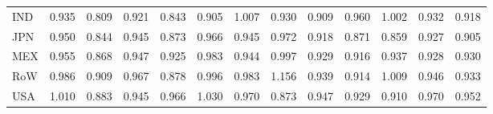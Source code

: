 \begin{table}[htbp]
\begin{tabular}{lcccccccccccc}
  IND & \textcolor[RGB]{138,89,117}{0.935} & \textcolor[RGB]{253,164,2}{0.809} & \textcolor[RGB]{176,114,79}{0.921} & \textcolor[RGB]{249,161,6}{0.843} & \textcolor[RGB]{219,142,36}{0.905} & \textcolor[RGB]{15,10,240}{1.007} & \textcolor[RGB]{151,98,104}{0.930} & \textcolor[RGB]{212,138,42}{0.909} & \textcolor[RGB]{74,48,181}{0.960} & \textcolor[RGB]{19,12,236}{1.002} & \textcolor[RGB]{147,95,108}{0.932} & \textcolor[RGB]{181,117,74}{0.918} \\ 
  JPN & \textcolor[RGB]{94,61,162}{0.950} & \textcolor[RGB]{246,160,8}{0.844} & \textcolor[RGB]{106,69,149}{0.945} & \textcolor[RGB]{232,150,23}{0.873} & \textcolor[RGB]{64,41,191}{0.966} & \textcolor[RGB]{102,66,153}{0.945} & \textcolor[RGB]{47,30,208}{0.972} & \textcolor[RGB]{185,120,70}{0.918} & \textcolor[RGB]{236,153,19}{0.871} & \textcolor[RGB]{240,155,15}{0.859} & \textcolor[RGB]{164,106,91}{0.927} & \textcolor[RGB]{215,139,40}{0.905} \\ 
  MEX & \textcolor[RGB]{83,54,172}{0.955} & \textcolor[RGB]{238,154,17}{0.868} & \textcolor[RGB]{96,62,159}{0.947} & \textcolor[RGB]{168,109,87}{0.925} & \textcolor[RGB]{36,23,219}{0.983} & \textcolor[RGB]{108,70,147}{0.944} & \textcolor[RGB]{25,16,230}{0.997} & \textcolor[RGB]{155,100,100}{0.929} & \textcolor[RGB]{195,126,60}{0.916} & \textcolor[RGB]{134,87,121}{0.937} & \textcolor[RGB]{159,103,96}{0.928} & \textcolor[RGB]{149,96,106}{0.930} \\ 
  RoW & \textcolor[RGB]{30,19,225}{0.986} & \textcolor[RGB]{210,136,45}{0.909} & \textcolor[RGB]{59,38,196}{0.967} & \textcolor[RGB]{230,148,26}{0.878} & \textcolor[RGB]{28,18,227}{0.996} & \textcolor[RGB]{34,22,221}{0.983} & \textcolor[RGB]{0,0,255}{1.156} & \textcolor[RGB]{123,80,132}{0.939} & \textcolor[RGB]{200,129,55}{0.914} & \textcolor[RGB]{13,8,242}{1.009} & \textcolor[RGB]{100,65,155}{0.946} & \textcolor[RGB]{140,91,115}{0.933} \\ 
  USA & \textcolor[RGB]{11,7,244}{1.010} & \textcolor[RGB]{227,147,28}{0.883} & \textcolor[RGB]{104,67,151}{0.945} & \textcolor[RGB]{66,43,189}{0.966} & \textcolor[RGB]{6,4,249}{1.030} & \textcolor[RGB]{55,36,200}{0.970} & \textcolor[RGB]{234,151,21}{0.873} & \textcolor[RGB]{98,63,157}{0.947} & \textcolor[RGB]{157,102,98}{0.929} & \textcolor[RGB]{206,133,49}{0.910} & \textcolor[RGB]{51,33,204}{0.970} & \textcolor[RGB]{87,56,168}{0.952} \\ 
   \hline
\end{tabular}
\end{table}
